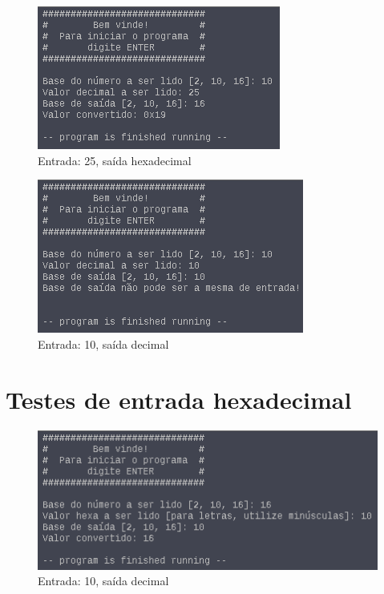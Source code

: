 \documentclass{article}
\begin{document}
\begin{figure}[H]
  \includegraphics[width=\linewidth]{./CasoDec7}
  \caption{Entrada: 25, saída hexadecimal}
  \label{fig:dec7}
\end{figure}

\begin{figure}[H]
  \includegraphics[width=\linewidth]{./CasoDec8}
  \caption{Entrada: 10, saída decimal}
  \label{fig:dec8}
\end{figure}

\section{Testes de entrada hexadecimal}

\begin{figure}[H]
  \includegraphics[width=\linewidth]{./CasoHexa1}
  \caption{Entrada: 10, saída decimal}
  \label{fig:hexa1}
\end{figure}
\end{document}
